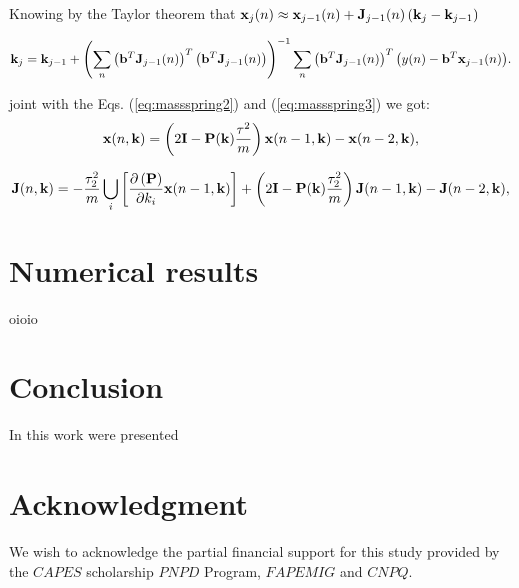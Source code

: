 \documentclass[11pt,twoside,a4paper]{article}
\newcommand{\MATRIX}[1]{\mathbf{\uppercase{#1}}}
\newcommand{\VECTOR}[1]{\mathbf{\lowercase{#1}}}
\begin{document}
Knowing by the Taylor theorem that 
$\VECTOR{X}_{j}(n) \approx \VECTOR{X}_{j-1}(n) + \MATRIX{J}_{j-1}(n)\left( \VECTOR{k}_{j} - \VECTOR{k}_{j-1}\right) $

\begin{equation}\label{eq:miniterative2}
\VECTOR{k}_{j} = \VECTOR{k}_{j-1} +
\left(\sum_{n}{ \left( \VECTOR{b}^{T}\MATRIX{J}_{j-1}(n)\right)^{T}\left(  \VECTOR{b}^{T}\MATRIX{J}_{j-1}(n) \right) }\right)^{-1} 
\sum_{n}{ \left( \VECTOR{b}^{T}\MATRIX{J}_{j-1}(n)\right)^{T} \left(y(n) - \VECTOR{b}^{T}\VECTOR{X}_{j-1}(n) \right) }.
\end{equation}

joint with the Eqs. (\ref{eq:massspring2}) and (\ref{eq:massspring3}) we got:
\begin{equation}\label{eq:massspring2b}
 \VECTOR{X}(n,\VECTOR{k}) = \left(2 \mathbf{I} -\mathbf{P(\VECTOR{k})}\frac{\tau^2}{m}\right) \VECTOR{X}(n-1,\VECTOR{k})-\VECTOR{X}(n-2,\VECTOR{k}),
\end{equation}

\begin{equation}\label{eq:massspring3b}
 \MATRIX{J}(n,\VECTOR{k}) = 
 -\frac{\tau_2^2}{m}\bigcup_{i}{ \left[ \frac{ \partial\left(\MATRIX{P}\right)}{\partial k_{i}}  \VECTOR{X}(n-1,\VECTOR{k})\right] }
 +\left(2 \mathbf{I} -\mathbf{P(\VECTOR{k})}\frac{\tau_2^2}{m}\right) \MATRIX{J}(n-1,\VECTOR{k})
 -\MATRIX{J}(n-2,\VECTOR{k}),
\end{equation}
\section{Numerical results} 
\label{sec:numerical}
oioio


\section{Conclusion} 

In this work were presented

\section{Acknowledgment}
We wish to acknowledge the partial financial support for this study provided by the $CAPES$ 
scholarship
$PNPD$ Program, $FAPEMIG$ and $CNPQ$.
\end{document}
